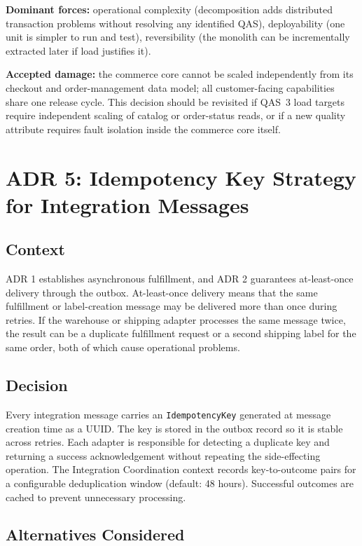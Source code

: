 \textbf{Dominant forces:} operational complexity (decomposition adds distributed transaction
problems without resolving any identified QAS), deployability (one unit is simpler to run and
test), reversibility (the monolith can be incrementally extracted later if load justifies it).

\textbf{Accepted damage:} the commerce core cannot be scaled independently from its checkout
and order-management data model; all customer-facing capabilities share one release cycle.
This decision should be revisited if QAS~3 load targets require independent scaling of
catalog or order-status reads, or if a new quality attribute requires fault isolation inside
the commerce core itself.

\section{ADR 5: Idempotency Key Strategy for Integration Messages}

\subsection{Context}

ADR 1 establishes asynchronous fulfillment, and ADR 2 guarantees at-least-once delivery
through the outbox. At-least-once delivery means that the same fulfillment or label-creation
message may be delivered more than once during retries. If the warehouse or shipping adapter
processes the same message twice, the result can be a duplicate fulfillment request or a
second shipping label for the same order, both of which cause operational problems.

\subsection{Decision}

Every integration message carries an \texttt{IdempotencyKey} generated at message creation
time as a UUID. The key is stored in the outbox record so it is stable across retries. Each
adapter is responsible for detecting a duplicate key and returning a success acknowledgement
without repeating the side-effecting operation. The Integration Coordination context records
key-to-outcome pairs for a configurable deduplication window (default: 48 hours). Successful
outcomes are cached to prevent unnecessary processing.

\subsection{Alternatives Considered}


